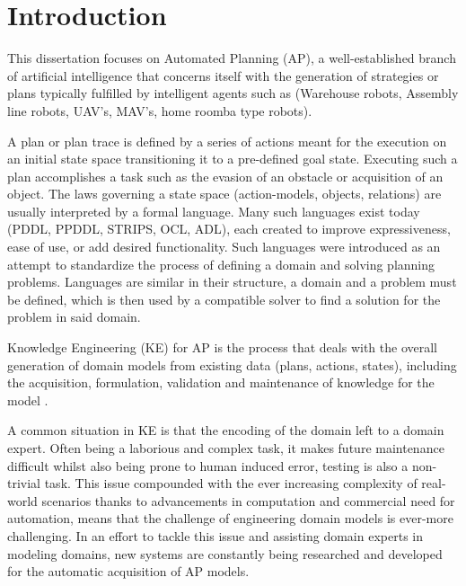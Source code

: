 \chapter{Introduction}

\cite{ReviewActionModels:article}


This dissertation focuses on Automated Planning (AP), a well-established branch of artificial intelligence that
concerns itself with the generation of strategies or plans typically fulfilled by intelligent agents such as
(Warehouse robots, Assembly line robots, UAV's, MAV's, home roomba type robots).

A plan or plan trace is defined by a series of actions meant for the execution on an initial state space
transitioning it to a pre-defined goal state. Executing such a plan accomplishes a task such as the evasion
of an obstacle or acquisition of an object.
The laws governing a state space (action-models, objects, relations) are usually interpreted by a formal language.
Many such languages exist today (PDDL, PPDDL, STRIPS, OCL, ADL), each created to improve expressiveness, ease of use,
or add desired functionality.
Such languages were introduced as an attempt to standardize the process of defining a domain and solving planning problems.
Languages are similar in their structure, a domain and a problem must be defined, which is then used by a compatible
solver to find a solution for the problem in said domain.

Knowledge Engineering (KE) for AP is the process that deals with the overall generation of domain models from existing
data (plans, actions, states), including the acquisition, formulation, validation and maintenance of knowledge for the
model \cite{AutomatedKETools:inproceedings}.

A common situation in KE is that the encoding of the domain left to a domain expert. Often being a laborious and complex task,
it makes future maintenance difficult whilst also being prone to human induced error, testing is also a non-trivial task.
This issue compounded with the ever increasing complexity of real-world scenarios thanks to advancements in computation
and commercial need for automation, means that the challenge of engineering domain models is ever-more challenging.
In an effort to tackle this issue and assisting domain experts in modeling domains, new systems are constantly
being researched and developed for the automatic acquisition of AP models.

